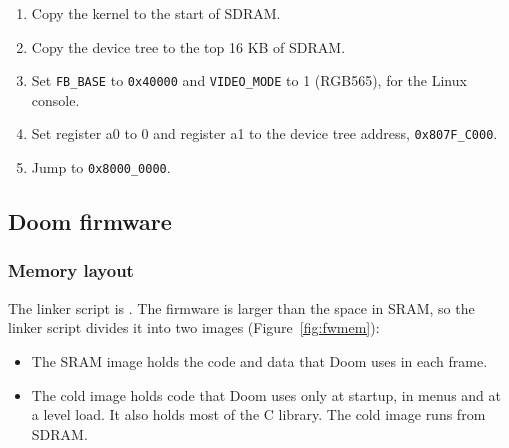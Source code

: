 \begin{enumerate}
  \item Copy the kernel to the start of SDRAM.
  \item Copy the device tree to the top 16 KB of SDRAM.
  \item Set \texttt{FB\_BASE} to \texttt{0x40000} and \texttt{VIDEO\_MODE} to 1 (RGB565), for the Linux console.
  \item Set register a0 to 0 and register a1 to the device tree address, \texttt{0x807F\_C000}.
  \item Jump to \texttt{0x8000\_0000}.
\end{enumerate}

\subsection{Doom firmware}

\subsubsection{Memory layout}
The linker script is . The firmware is larger than the space in SRAM, so the linker script divides it into two images (Figure~\ref{fig:fwmem}):

\begin{itemize}
  \item The SRAM image holds the code and data that Doom uses in each frame.
  \item The cold image holds code that Doom uses only at startup, in menus and at a level load. It also holds most of the C library. The cold image runs from SDRAM.
\end{itemize}

